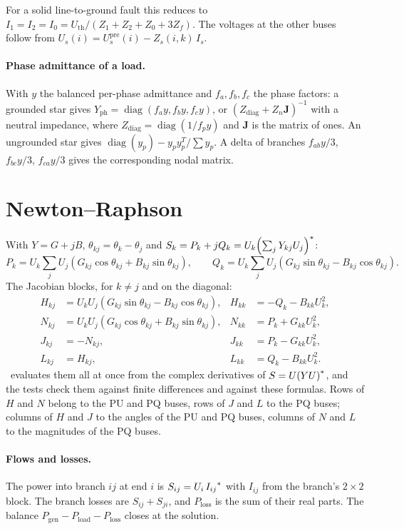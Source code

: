 For a solid line-to-ground fault this reduces to $I_1 = I_2 = I_0 = U_\text{th}/(Z_1 + Z_2
+ Z_0 + 3Z_f)$. The voltages at the other buses follow from $U_s(i) = U^\text{pre}_s(i) -
Z_s(i,k)\,I_s$.

\paragraph{Phase admittance of a load.} With $y$ the balanced per-phase admittance and
$f_a, f_b, f_c$ the phase factors: a grounded star gives $Y_\text{ph} =
\operatorname{diag}(f_a y, f_b y, f_c y)$, or $(Z_\text{diag} + Z_n\mathbf{J})^{-1}$ with
a neutral impedance, where $Z_\text{diag} = \operatorname{diag}(1/f_p y)$ and $\mathbf{J}$
is the matrix of ones. An ungrounded star gives $\operatorname{diag}(y_p) - y_p y_p^T/\sum
y_p$. A delta of branches $f_{ab}y/3$, $f_{bc}y/3$, $f_{ca}y/3$ gives the corresponding
nodal matrix.

\section{Newton--Raphson}\label{sec:nr}

With $Y = G + jB$, $\theta_{kj} = \theta_k - \theta_j$ and $S_k = P_k + jQ_k = U_k
{\left(\sum_j Y_{kj}U_j\right)}^{*}$:
\[
  P_k = U_k \sum_j U_j\left(G_{kj}\cos\theta_{kj} + B_{kj}\sin\theta_{kj}\right),\qquad
  Q_k = U_k \sum_j U_j\left(G_{kj}\sin\theta_{kj} - B_{kj}\cos\theta_{kj}\right).
\]
The Jacobian blocks, for $k \ne j$ and on the diagonal:
\begin{align*}
  H_{kj} &= U_kU_j\left(G_{kj}\sin\theta_{kj} - B_{kj}\cos\theta_{kj}\right), &
  H_{kk} &= -Q_k - B_{kk}U_k^2,\\
  N_{kj} &= U_kU_j\left(G_{kj}\cos\theta_{kj} + B_{kj}\sin\theta_{kj}\right), &
  N_{kk} &= P_k + G_{kk}U_k^2,\\
  J_{kj} &= -N_{kj}, &
  J_{kk} &= P_k - G_{kk}U_k^2,\\
  L_{kj} &= H_{kj}, &
  L_{kk} &= Q_k - B_{kk}U_k^2.
\end{align*}
\app\ evaluates them all at once from the complex derivatives of $S = U{(YU)}^{*}$, and
the tests check them against finite differences and against these formulas. Rows of $H$
and $N$ belong to the PU and PQ buses, rows of $J$ and $L$ to the PQ buses; columns of
$H$ and $J$ to the angles of the PU and PQ buses, columns of $N$ and $L$ to the
magnitudes of the PQ buses.

\paragraph{Flows and losses.} The power into branch $ij$ at end $i$ is $S_{ij} =
U_i\,{I_{ij}}^{*}$ with $I_{ij}$ from the branch's $2\times2$ block. The branch losses are
$S_{ij} + S_{ji}$, and $P_\text{loss}$ is the sum of their real parts. The balance
$P_\text{gen} - P_\text{load} - P_\text{loss}$ closes at the solution.

